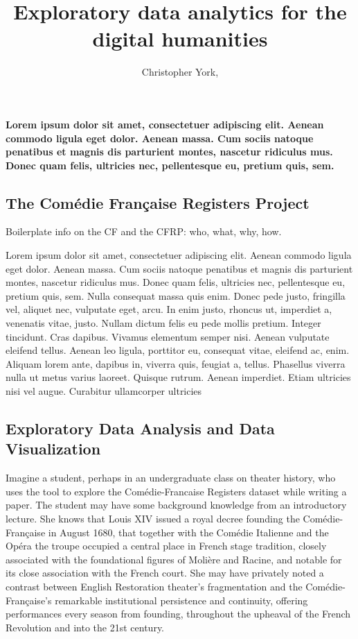 \documentclass[	DIV=calc,%
							paper=a4,%
							fontsize=11pt,%
							twocolumn]{scrartcl}	 					%
\title{Exploratory data analytics for the digital humanities}					%
\author{Christopher York, }										%
\date{}																				%
\begin{document}
\maketitle
\thispagestyle{fancy} 			%
\noindent
\textbf{Lorem ipsum dolor sit amet, consectetuer adipiscing elit. Aenean commodo ligula eget dolor. Aenean massa. Cum sociis natoque penatibus et magnis dis parturient montes, nascetur ridiculus mus. Donec quam felis, ultricies nec, pellentesque eu, pretium quis, sem.}

\subsection*{The Comédie Française Registers Project}
Boilerplate info on the CF and the CFRP: who, what, why, how.

Lorem ipsum dolor sit amet, consectetuer adipiscing elit. Aenean commodo ligula eget dolor. Aenean massa. Cum sociis natoque penatibus et magnis dis parturient montes, nascetur ridiculus mus. Donec quam felis, ultricies nec, pellentesque eu, pretium quis, sem. Nulla consequat massa quis enim. Donec pede justo, fringilla vel, aliquet nec, vulputate eget, arcu. In enim justo, rhoncus ut, imperdiet a, venenatis vitae, justo. Nullam dictum felis eu pede mollis pretium. Integer tincidunt. Cras dapibus. Vivamus elementum semper nisi. Aenean vulputate eleifend tellus. Aenean leo ligula, porttitor eu, consequat vitae, eleifend ac, enim. Aliquam lorem ante, dapibus in, viverra quis, feugiat a, tellus. Phasellus viverra nulla ut metus varius laoreet. Quisque rutrum. Aenean imperdiet. Etiam ultricies nisi vel augue. Curabitur ullamcorper ultricies


\subsection*{Exploratory Data Analysis and Data Visualization}

Imagine a student, perhaps in an undergraduate class on theater history, who uses the tool to explore the Comédie-Francaise Registers dataset while writing a paper. The student may have some background knowledge from an introductory lecture.  She knows that Louis XIV issued a royal decree founding the Comédie-Française in August 1680, that together with the Comédie Italienne and the Opéra the troupe occupied a central place in French stage tradition, closely associated with the foundational figures of Molière and Racine, and notable for its close association with the French court.  She may have privately noted a contrast between English Restoration theater’s fragmentation and the Comédie-Française’s remarkable institutional persistence and continuity, offering performances every season from founding, throughout the upheaval of the French Revolution and into the 21st century.
\end{document}
